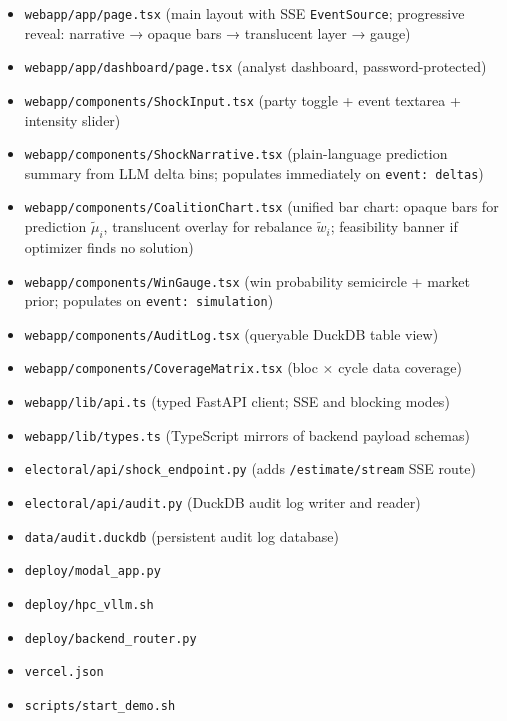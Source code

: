 \documentclass[11pt]{article}
\begin{document}
\begin{itemize}[leftmargin=1.6em, itemsep=2pt]
  \item \texttt{webapp/app/page.tsx} (main layout with SSE \texttt{EventSource};
        progressive reveal: narrative → opaque bars → translucent layer → gauge)
  \item \texttt{webapp/app/dashboard/page.tsx} (analyst dashboard, password-protected)
  \item \texttt{webapp/components/ShockInput.tsx} (party toggle + event textarea + intensity slider)
  \item \texttt{webapp/components/ShockNarrative.tsx} (plain-language prediction summary
        from LLM delta bins; populates immediately on \texttt{event: deltas})
  \item \texttt{webapp/components/CoalitionChart.tsx} (unified bar chart: opaque bars
        for prediction $\tilde{\mu}_i$, translucent overlay for rebalance $\tilde{w}_i$;
        feasibility banner if optimizer finds no solution)
  \item \texttt{webapp/components/WinGauge.tsx} (win probability semicircle + market prior;
        populates on \texttt{event: simulation})
  \item \texttt{webapp/components/AuditLog.tsx} (queryable DuckDB table view)
  \item \texttt{webapp/components/CoverageMatrix.tsx} (bloc $\times$ cycle data coverage)
  \item \texttt{webapp/lib/api.ts} (typed FastAPI client; SSE and blocking modes)
  \item \texttt{webapp/lib/types.ts} (TypeScript mirrors of backend payload schemas)
  \item \texttt{electoral/api/shock\_endpoint.py} (adds \texttt{/estimate/stream} SSE route)
  \item \texttt{electoral/api/audit.py} (DuckDB audit log writer and reader)
  \item \texttt{data/audit.duckdb} (persistent audit log database)
  \item \texttt{deploy/modal\_app.py}
  \item \texttt{deploy/hpc\_vllm.sh}
  \item \texttt{deploy/backend\_router.py}
  \item \texttt{vercel.json}
  \item \texttt{scripts/start\_demo.sh}
\end{itemize}

\end{document}

